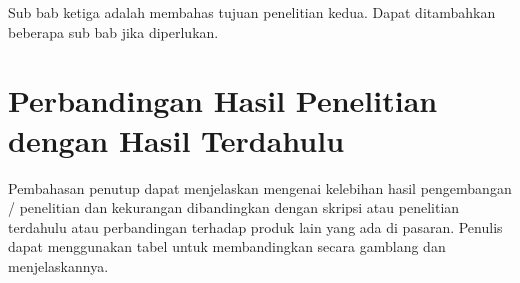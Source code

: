 Sub bab ketiga adalah membahas tujuan penelitian kedua. Dapat ditambahkan beberapa sub bab jika diperlukan.

\section{Perbandingan Hasil Penelitian dengan Hasil Terdahulu}

Pembahasan penutup dapat menjelaskan mengenai kelebihan hasil pengembangan /
penelitian dan kekurangan dibandingkan dengan skripsi atau penelitian terdahulu atau
perbandingan terhadap produk lain yang ada di pasaran. Penulis dapat menggunakan tabel untuk membandingkan secara gamblang dan menjelaskannya.